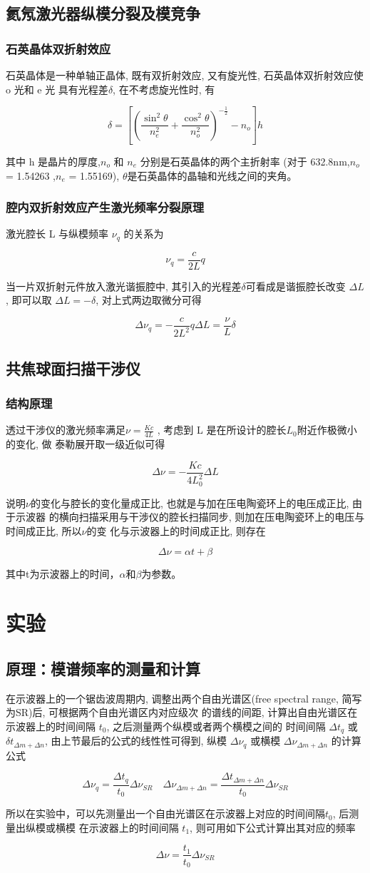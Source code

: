 \documentclass[12pt,a4paper]{article}
\newcommand{\be}[1]{
    \begin{equation}
        #1
    \end{equation}
}
\begin{document}
\subsection{氦氖激光器纵模分裂及模竞争}
\subsubsection{石英晶体双折射效应}
石英晶体是一种单轴正晶体, 既有双折射效应, 又有旋光性, 石英晶体双折射效应使 o 光和 e 光
具有光程差$\delta$, 在不考虑旋光性时, 有
\be{\delta=\left[\left(\frac{\sin ^{2} \theta}{n_{e}^{2}}+\frac{\cos ^{2} \theta}{n_{o}^{2}}\right)^{-\frac{1}{2}}-n_{o}\right] h}
其中 h 是晶片的厚度,$n_o$ 和 $n_e$ 分别是石英晶体的两个主折射率 (对于 632.8nm,$n_o$ = 1.54263 ,$n_e$ =
1.55169), $\theta$是石英晶体的晶轴和光线之间的夹角。\cite{zhao2006optics}
\subsubsection{腔内双折射效应产生激光频率分裂原理}
激光腔长 L 与纵模频率 $\nu_q$ 的关系为
\be{\nu_q=\frac{c}{2 L}q}
当一片双折射元件放入激光谐振腔中, 其引入的光程差$\delta$可看成是谐振腔长改变 $\Delta L$, 即可以取
$\Delta L=-\delta$, 对上式两边取微分可得
\be{\Delta \nu_{q}=-\frac{c}{2 L^{2}} q \Delta L=\frac{\nu}{L} \delta}
\subsection{共焦球面扫描干涉仪}
\subsubsection{结构原理}
透过干涉仪的激光频率满足$\nu=\frac{K c }{4 L}$
, 考虑到 L 是在所设计的腔长$L_0$附近作极微小的变化, 做
泰勒展开取一级近似可得
\be{\Delta \nu=-\frac{K c}{4 L_{0}^{2}} \Delta L}
说明$\nu$的变化与腔长的变化量成正比, 也就是与加在压电陶瓷环上的电压成正比, 由于示波器
的横向扫描采用与干涉仪的腔长扫描同步, 则加在压电陶瓷环上的电压与时间成正比\cite{thorlabs2020confocal}, 所以$\nu$的变
化与示波器上的时间成正比, 则存在
\be{\Delta \nu=\alpha t+\beta}
其中t为示波器上的时间，$\alpha$和$\beta$为参数。
\section{实验}
\subsection{原理：模谱频率的测量和计算}
在示波器上的一个锯齿波周期内, 调整出两个自由光谱区(free spectral range, 简写为SR)后, 可根据两个自由光谱区内对应级次
的谱线的间距, 计算出自由光谱区在示波器上的时间间隔 $t_0$, 之后测量两个纵模或者两个横模之间的
时间间隔 $\Delta t_q$ 或 $\delta t_{\Delta m+\Delta n}$, 由上节最后的公式的线性性可得到, 纵模 $\Delta \nu_q$ 或横模 $\Delta \nu_{\Delta m+\Delta n}$ 的计算公式
\be{\Delta \nu_{q}=\frac{\Delta t_{q}}{t_{0}} \Delta \nu_{S R} \quad \Delta \nu_{\Delta m+\Delta n}=\frac{\Delta t_{\Delta m+\Delta n}}{t_{0}} \Delta \nu_{S R}}
所以在实验中，可以先测量出一个自由光谱区在示波器上对应的时间间隔$ t_0$, 后测量出纵模或横模
在示波器上的时间间隔 $t_1$, 则可用如下公式计算出其对应的频率
\be{\Delta \nu=\frac{t_{1}}{t_{0}} \Delta \nu_{S R}}
\end{document}
